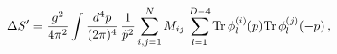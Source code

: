 \begin{equation}
\Delta S' ={g^2 \over 4 \pi^2} \int {d^4 p \over (2 \pi)^4} \, {1 \over
{\tilde p}^2 } \sum_{i,j=1}^N M_{ij} \, \sum_{l=1}^{D-4}
{\rm Tr}\, \phi_l^{(i)}(p) {\rm Tr}\, \phi_l^{(j)}(-p) \, ,
\label{polescalar}
\end{equation} 
